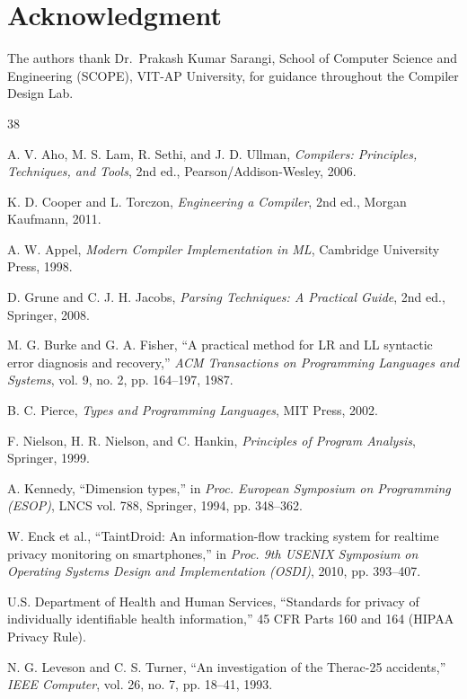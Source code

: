 \documentclass[conference]{IEEEtran}
\begin{document}
\section*{Acknowledgment}
The authors thank Dr.\ Prakash Kumar Sarangi, School of Computer Science and Engineering (SCOPE), VIT-AP University, for guidance throughout the Compiler Design Lab.

\begin{thebibliography}{38}

A. V. Aho, M. S. Lam, R. Sethi, and J. D. Ullman,
\textit{Compilers: Principles, Techniques, and Tools},
2nd ed., Pearson/Addison-Wesley, 2006.

K. D. Cooper and L. Torczon,
\textit{Engineering a Compiler},
2nd ed., Morgan Kaufmann, 2011.

A. W. Appel,
\textit{Modern Compiler Implementation in ML},
Cambridge University Press, 1998.

D. Grune and C. J. H. Jacobs,
\textit{Parsing Techniques: A Practical Guide},
2nd ed., Springer, 2008.

M. G. Burke and G. A. Fisher,
``A practical method for LR and LL syntactic error diagnosis and recovery,''
\textit{ACM Transactions on Programming Languages and Systems}, vol. 9, no. 2, pp. 164--197, 1987.

B. C. Pierce,
\textit{Types and Programming Languages},
MIT Press, 2002.

F. Nielson, H. R. Nielson, and C. Hankin,
\textit{Principles of Program Analysis},
Springer, 1999.

A. Kennedy,
``Dimension types,''
in \textit{Proc. European Symposium on Programming (ESOP)}, LNCS vol. 788, Springer, 1994, pp. 348--362.

W. Enck et al.,
``TaintDroid: An information-flow tracking system for realtime privacy monitoring on smartphones,''
in \textit{Proc. 9th USENIX Symposium on Operating Systems Design and Implementation (OSDI)}, 2010, pp. 393--407.

U.S. Department of Health and Human Services,
``Standards for privacy of individually identifiable health information,''
45 CFR Parts 160 and 164 (HIPAA Privacy Rule).

N. G. Leveson and C. S. Turner,
``An investigation of the Therac-25 accidents,''
\textit{IEEE Computer}, vol. 26, no. 7, pp. 18--41, 1993.


\end{thebibliography}
\end{document}
